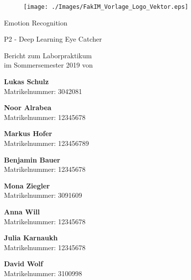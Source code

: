 \documentclass[12pt,a4paper,headinclude,twoside, plainheadsepline, open=right,numbers=noenddot]{scrreprt}
\begin{document}
\pagestyle{empty}

\clearscrheadings\clearscrplain

\begin{titlepage}
\begin{figure}[thb]
       \texttt{[image: ./Images/FakIM\_Vorlage\_Logo\_Vektor.eps]}
\end{figure}
\begin{center}
\rule{0pt}{0pt}
\vfill

\begin{huge}
Emotion Recognition\\[0.75ex]
\end{huge}
\begin{large}
P2 - Deep Learning Eye Catcher
\end{large}


\vfill
\vfill

Bericht zum Laborpraktikum\\
im Sommersemester 2019 von\\
\vfill
\setlength{\columnsep}{.0cm}
\begin{multicols}{1}

\textbf{Lukas Schulz}\\
Matrikelnummer: 3042081

\textbf{Noor Alrabea}\\
Matrikelnummer: 12345678
\end{multicols}

\begin{multicols}{2}
\textbf{Markus Hofer}\\
Matrikelnummer: 123456789

\textbf{Benjamin Bauer}\\
Matrikelnummer: 12345678
\end{multicols}

\begin{multicols}{2}
\textbf{Mona Ziegler}\\
Matrikelnummer: 3091609

\textbf{Anna Will}\\
Matrikelnummer: 12345678
\end{multicols}


\begin{multicols}{2}
\textbf{Julia Karnaukh}\\
Matrikelnummer: 12345678

\textbf{David Wolf}\\
Matrikelnummer: 3100998
\end{multicols}


\end{center}
\end{titlepage}
\end{document}
